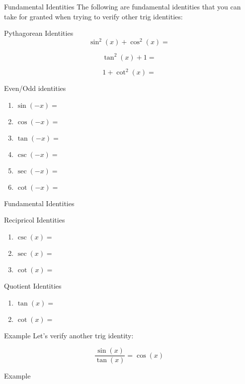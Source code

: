 \documentclass[presentation]{beamer}
\begin{document}
\begin{frame}[label={sec:orgb8f20df}]{Fundamental Identities}
The following are fundamental identities that you can take for granted when trying to verify other trig identities:

\begin{block}{Pythagorean Identities}
\[\sin^2 \left( x \right) + \cos^2 \left( x \right) = \]

\[
\tan^2(x) + 1 = \]

\[
1 + \cot^2(x) = \]
\end{block}


\begin{block}{Even/Odd identities}
\begin{enumerate}
\item \(\sin(-x) =\)
\item \(\cos(-x) =\)
\item \(\tan(-x) =\)
\item \(\csc(-x) =\)
\item \(\sec(-x) =\)
\item \(\cot(-x) =\)
\end{enumerate}
\end{block}
\end{frame}

\begin{frame}[label={sec:orgde202a8}]{Fundamental Identities}
\begin{block}{Recipricol Identities}
\begin{enumerate}
\item \(\csc(x) =\)
\item \(\sec(x) =\)
\item \(\cot(x) =\)
\end{enumerate}
\end{block}

\begin{block}{Quotient Identities}
\begin{enumerate}
\item \(\tan(x) =\)
\item \(\cot(x) =\)
\end{enumerate}
\end{block}
\end{frame}


\begin{frame}[label={sec:orgcdfbd31}]{Example}
Let's verify another trig identity:

\[
\frac{\sin(x)}{\tan(x)} = \cos(x)
\]

\vspace{10in}
\end{frame}
\begin{frame}[label={sec:orgea8b093}]{Example}
\end{frame}
\end{document}
